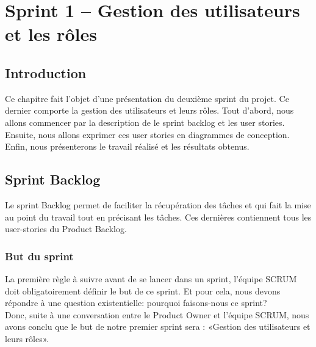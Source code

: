 \chapter{Sprint 1 – Gestion des utilisateurs et les rôles}
	
\section*{Introduction}
Ce chapitre fait l’objet d’une présentation du deuxième sprint du projet. Ce dernier comporte la gestion des utilisateurs et leurs rôles.
Tout d'abord, nous allons commencer par la description de le sprint backlog et les user stories. Ensuite, nous allons exprimer ces user stories en diagrammes de conception. Enfin, nous présenterons le travail réalisé et les résultats obtenus.
\section[Sprint Backlog]{Sprint Backlog}
Le sprint Backlog permet de faciliter la récupération des tâches et qui fait la mise au point du travail tout en précisant les tâches. Ces dernières contiennent tous les user-stories du Product Backlog.
\subsection[But du sprint]{But du sprint}
La première règle à suivre avant de se lancer dans un sprint, l’équipe SCRUM doit obligatoirement définir le but de ce sprint. Et pour cela, nous devons répondre à une question existentielle: pourquoi faisons-nous ce sprint?\\
Donc, suite à une conversation entre le Product Owner et l’équipe SCRUM, nous avons conclu que le but de notre premier sprint sera : «Gestion des utilisateurs et leurs rôles».
